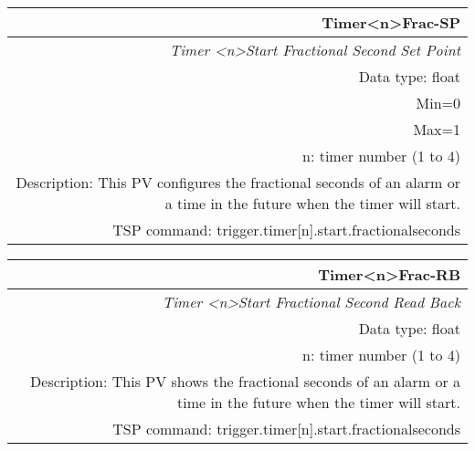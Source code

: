\documentclass[openany]{article}
\begin{document}
		\begin{tabular}{N}
			\hline
			\bfseries Timer{\textless n\textgreater}Frac-SP\label{pv:timerfrac-sp} \\ \hline
			\emph{Timer \textless n\textgreater Start Fractional Second Set Point} \\
			Data type: float \\
			Min=0 \\
			Max=1 \\
			n: timer number (1 to 4) \\
			Description: This PV configures the fractional seconds of an alarm or a time in the future when the timer will start. \\
			TSP command: trigger.timer[n].start.fractionalseconds
		\end{tabular}

		\begin{tabular}{N}
			\hline
			\bfseries Timer{\textless n\textgreater}Frac-RB\label{pv:timerfrac-rb} \\ \hline
			\emph{Timer \textless n\textgreater Start Fractional Second Read Back} \\
			Data type: float \\
			n: timer number (1 to 4) \\
			Description: This PV shows the fractional seconds of an alarm or a time in the future when the timer will start. \\
			TSP command: trigger.timer[n].start.fractionalseconds
		\end{tabular}
\end{document}
